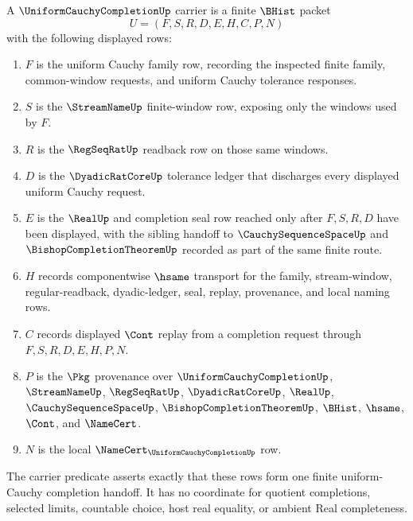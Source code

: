\begin{definition}
\label{def:uniform-cauchy-completion-carrier}
A $\UniformCauchyCompletionUp$ carrier is a finite $\BHist$ packet
$$
U=(F,S,R,D,E,H,C,P,N)
$$
with the following displayed rows:
\begin{enumerate}
\item $F$ is the uniform Cauchy family row, recording the inspected finite family, common-window requests, and uniform Cauchy tolerance responses.
\item $S$ is the $\StreamNameUp$ finite-window row, exposing only the windows used by $F$.
\item $R$ is the $\RegSeqRatUp$ readback row on those same windows.
\item $D$ is the $\DyadicRatCoreUp$ tolerance ledger that discharges every displayed uniform Cauchy request.
\item $E$ is the $\RealUp$ and completion seal row reached only after $F,S,R,D$ have been displayed, with the sibling handoff to $\CauchySequenceSpaceUp$ and $\BishopCompletionTheoremUp$ recorded as part of the same finite route.
\item $H$ records componentwise $\hsame$ transport for the family, stream-window, regular-readback, dyadic-ledger, seal, replay, provenance, and local naming rows.
\item $C$ records displayed $\Cont$ replay from a completion request through $F,S,R,D,E,H,P,N$.
\item $P$ is the $\Pkg$ provenance over $\UniformCauchyCompletionUp$, $\StreamNameUp$, $\RegSeqRatUp$, $\DyadicRatCoreUp$, $\RealUp$, $\CauchySequenceSpaceUp$, $\BishopCompletionTheoremUp$, $\BHist$, $\hsame$, $\Cont$, and $\NameCert$.
\item $N$ is the local $\NameCert_{\UniformCauchyCompletionUp}$ row.
\end{enumerate}
The carrier predicate asserts exactly that these rows form one finite uniform-Cauchy completion handoff. It has no coordinate for quotient completions, selected limits, countable choice, host real equality, or ambient Real completeness.
\end{definition}

